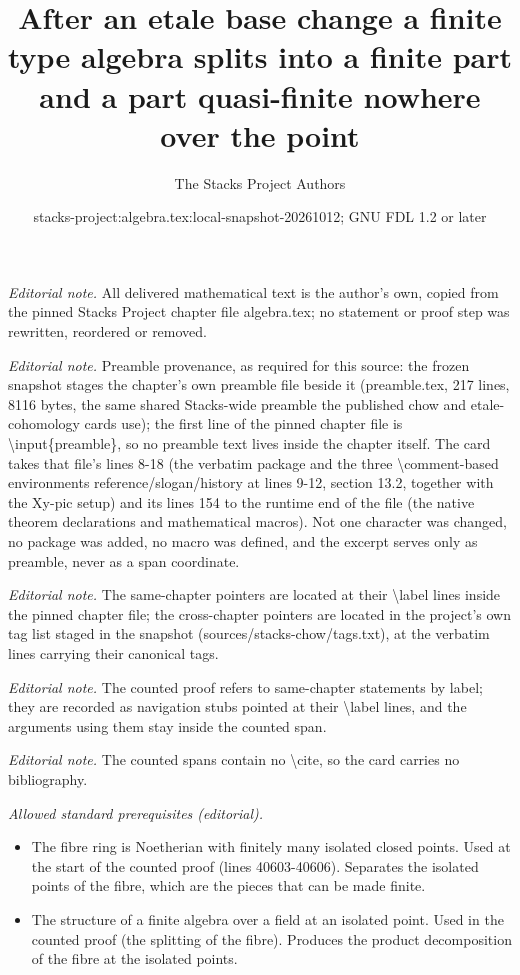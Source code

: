 \documentclass[10pt,a4paper]{amsart}
\title{After an etale base change a finite type algebra splits into a finite part and a part quasi-finite nowhere over the point}
\author{The Stacks Project Authors}
\date{stacks-project:algebra.tex:local-snapshot-20261012; GNU FDL 1.2 or later}
\theoremstyle{plain}
\theoremstyle{definition}
\theoremstyle{remark}
\numberwithin{equation}{subsection}
\begin{document}
\maketitle
\noindent\textit{Editorial note.} All delivered mathematical text is the author's own, copied from the pinned Stacks Project chapter file algebra.tex; no statement or proof step was rewritten, reordered or removed.\par\medskip
\noindent\textit{Editorial note.} Preamble provenance, as required for this source: the frozen snapshot stages the chapter's own preamble file beside it (preamble.tex, 217 lines, 8116 bytes, the same shared Stacks-wide preamble the published chow and etale-cohomology cards use); the first line of the pinned chapter file is \textbackslash{}input\{preamble\}, so no preamble text lives inside the chapter itself. The card takes that file's lines 8-18 (the verbatim package and the three \textbackslash{}comment-based environments reference/slogan/history at lines 9-12, section 13.2, together with the Xy-pic setup) and its lines 154 to the runtime end of the file (the native theorem declarations and mathematical macros). Not one character was changed, no package was added, no macro was defined, and the excerpt serves only as preamble, never as a span coordinate.\par\medskip
\noindent\textit{Editorial note.} The same-chapter pointers are located at their \textbackslash{}label lines inside the pinned chapter file; the cross-chapter pointers are located in the project's own tag list staged in the snapshot (sources/stacks-chow/tags.txt), at the verbatim lines carrying their canonical tags.\par\medskip
\noindent\textit{Editorial note.} The counted proof refers to same-chapter statements by label; they are recorded as navigation stubs pointed at their \textbackslash{}label lines, and the arguments using them stay inside the counted span.\par\medskip
\noindent\textit{Editorial note.} The counted spans contain no \textbackslash{}cite, so the card carries no bibliography.\par\medskip
\noindent\textit{Allowed standard prerequisites (editorial).}\begin{itemize}
\item The fibre ring is Noetherian with finitely many isolated closed points. Used at the start of the counted proof (lines 40603-40606). Separates the isolated points of the fibre, which are the pieces that can be made finite.
\item The structure of a finite algebra over a field at an isolated point. Used in the counted proof (the splitting of the fibre). Produces the product decomposition of the fibre at the isolated points.
\end{itemize}\medskip
\end{document}
